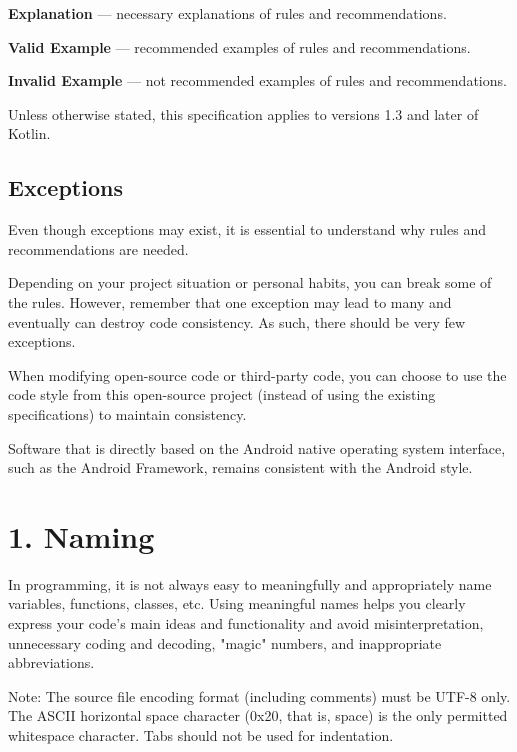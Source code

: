 \textbf{Explanation} — necessary explanations of rules and recommendations.



\textbf{Valid Example} — recommended examples of rules and recommendations.



\textbf{Invalid Example} — not recommended examples of rules and recommendations.



Unless otherwise stated, this specification applies to versions 1.3 and later of Kotlin.



\subsection*{\textbf{Exceptions}}



Even though exceptions may exist, it is essential to understand why rules and recommendations are needed.

Depending on your project situation or personal habits, you can break some of the rules. However, remember that one exception may lead to many and eventually can destroy code consistency. As such, there should be very few exceptions.

When modifying open-source code or third-party code, you can choose to use the code style from this open-source project (instead of using the existing specifications) to maintain consistency.

Software that is directly based on the Android native operating system interface, such as the Android Framework, remains consistent with the Android style.

\section*{\textbf{1. Naming}}

In programming, it is not always easy to meaningfully and appropriately name variables, functions, classes, etc. Using meaningful names helps you clearly express your code's main ideas and functionality and avoid misinterpretation, unnecessary coding and decoding, "magic" numbers, and inappropriate abbreviations.



Note: The source file encoding format (including comments) must be UTF-8 only. The ASCII horizontal space character (0x20, that is, space) is the only permitted whitespace character. Tabs should not be used for indentation.



